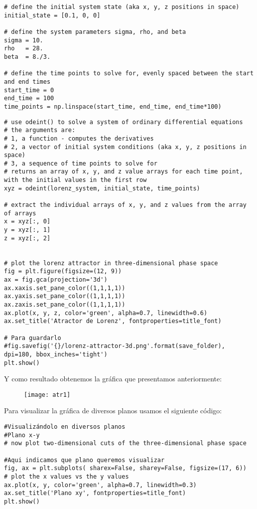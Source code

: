 \documentclass[12pt]{article}
\begin{document}
\begin{verbatim}
# define the initial system state (aka x, y, z positions in space)
initial_state = [0.1, 0, 0]

# define the system parameters sigma, rho, and beta
sigma = 10.
rho   = 28.
beta  = 8./3.

# define the time points to solve for, evenly spaced between the start and end times
start_time = 0
end_time = 100
time_points = np.linspace(start_time, end_time, end_time*100)
\end{verbatim}

\begin{verbatim}
# use odeint() to solve a system of ordinary differential equations
# the arguments are: 
# 1, a function - computes the derivatives
# 2, a vector of initial system conditions (aka x, y, z positions in space)
# 3, a sequence of time points to solve for
# returns an array of x, y, and z value arrays for each time point, with the initial values in the first row
xyz = odeint(lorenz_system, initial_state, time_points)

# extract the individual arrays of x, y, and z values from the array of arrays
x = xyz[:, 0]
y = xyz[:, 1]
z = xyz[:, 2]


# plot the lorenz attractor in three-dimensional phase space
fig = plt.figure(figsize=(12, 9))
ax = fig.gca(projection='3d')
ax.xaxis.set_pane_color((1,1,1,1))
ax.yaxis.set_pane_color((1,1,1,1))
ax.zaxis.set_pane_color((1,1,1,1))
ax.plot(x, y, z, color='green', alpha=0.7, linewidth=0.6)
ax.set_title('Atractor de Lorenz', fontproperties=title_font)

# Para guardarlo
#fig.savefig('{}/lorenz-attractor-3d.png'.format(save_folder), dpi=180, bbox_inches='tight')
plt.show()
\end{verbatim}
\newpage 
Y como resultado obtenemos la gráfica que presentamos anteriormente:

\begin{figure}[ht]
\texttt{[image: atr1]}
\centering
\end{figure}

Para visualizar la gráfica de diversos planos usamos el siguiente código:

\begin{verbatim}
#Visualizándolo en diversos planos
#Plano x-y
# now plot two-dimensional cuts of the three-dimensional phase space

#Aqui indicamos que plano queremos visualizar
fig, ax = plt.subplots( sharex=False, sharey=False, figsize=(17, 6))
# plot the x values vs the y values
ax.plot(x, y, color='green', alpha=0.7, linewidth=0.3)
ax.set_title('Plano xy', fontproperties=title_font)
plt.show()
\end{verbatim}
\end{document}
